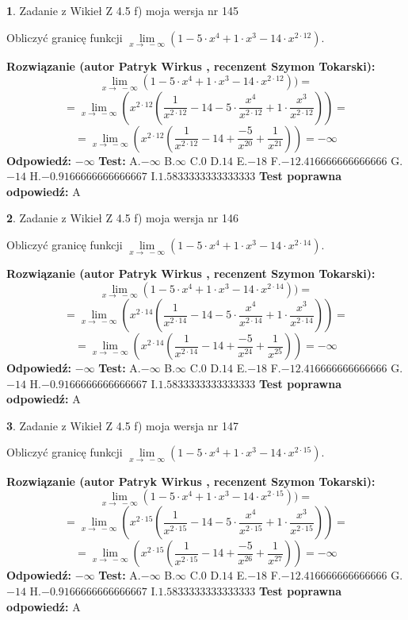 \documentclass[12pt, a4paper]{article}
\theoremstyle{definition} %
\newtheorem{zad}{}
\newcommand{\zadStart}[1]{\begin{zad}#1\newline}
\newcommand{\zadStop}{\end{zad}}
\newcommand{\rozwStart}[2]{\noindent \textbf{Rozwiązanie (autor #1 , recenzent #2): }\newline}
\newcommand{\rozwStop}{\newline}
\newcommand{\odpStart}{\noindent \textbf{Odpowiedź:}\newline}
\newcommand{\odpStop}{\newline}
\newcommand{\testStart}{\noindent \textbf{Test:}\newline}
\newcommand{\testStop}{\newline}
\newcommand{\kluczStart}{\noindent \textbf{Test poprawna odpowiedź:}\newline}
\newcommand{\kluczStop}{\newline}
\begin{document}
\zadStart{Zadanie z Wikieł Z 4.5 f) moja wersja nr 145}


Obliczyć granicę funkcji  $\lim\limits_{x\to\ -\infty}(1 - 5 \cdot x^{4}+1 \cdot x^{3}- 14 \cdot x^{2\cdot12})$.
\zadStop
\rozwStart{Patryk Wirkus}{Szymon Tokarski}
$$\lim\limits_{x\to\ -\infty}(1 - 5 \cdot x^{4}+1 \cdot x^{3}- 14 \cdot x^{2\cdot12}))=$$
$$=\lim\limits_{x\to\ -\infty}(x^{2\cdot12}(\frac{1}{x^{2\cdot12}}-14 -5 \cdot \frac{x^{4}}{x^{2\cdot12}}+1 \cdot \frac{x^{3}}{x^{2\cdot12}}))=$$
$$=\lim\limits_{x\to\ -\infty}(x^{2\cdot12}(\frac{1}{x^{2\cdot12}}-14 + \frac{-5}{x^{20}}+ \frac{1}{x^{21}}))=-\infty$$
\rozwStop
\odpStart
$-\infty$
\odpStop
\testStart
A.$-\infty$ B.$\infty$ C.$0$ D.$14$ E.$-18$
F.$-12.416666666666666$ G.$-14$
H.$-0.9166666666666667$
I.$1.5833333333333333$
\testStop
\kluczStart
A
\kluczStop



\zadStart{Zadanie z Wikieł Z 4.5 f) moja wersja nr 146}


Obliczyć granicę funkcji  $\lim\limits_{x\to\ -\infty}(1 - 5 \cdot x^{4}+1 \cdot x^{3}- 14 \cdot x^{2\cdot14})$.
\zadStop
\rozwStart{Patryk Wirkus}{Szymon Tokarski}
$$\lim\limits_{x\to\ -\infty}(1 - 5 \cdot x^{4}+1 \cdot x^{3}- 14 \cdot x^{2\cdot14}))=$$
$$=\lim\limits_{x\to\ -\infty}(x^{2\cdot14}(\frac{1}{x^{2\cdot14}}-14 -5 \cdot \frac{x^{4}}{x^{2\cdot14}}+1 \cdot \frac{x^{3}}{x^{2\cdot14}}))=$$
$$=\lim\limits_{x\to\ -\infty}(x^{2\cdot14}(\frac{1}{x^{2\cdot14}}-14 + \frac{-5}{x^{24}}+ \frac{1}{x^{25}}))=-\infty$$
\rozwStop
\odpStart
$-\infty$
\odpStop
\testStart
A.$-\infty$ B.$\infty$ C.$0$ D.$14$ E.$-18$
F.$-12.416666666666666$ G.$-14$
H.$-0.9166666666666667$
I.$1.5833333333333333$
\testStop
\kluczStart
A
\kluczStop



\zadStart{Zadanie z Wikieł Z 4.5 f) moja wersja nr 147}


Obliczyć granicę funkcji  $\lim\limits_{x\to\ -\infty}(1 - 5 \cdot x^{4}+1 \cdot x^{3}- 14 \cdot x^{2\cdot15})$.
\zadStop
\rozwStart{Patryk Wirkus}{Szymon Tokarski}
$$\lim\limits_{x\to\ -\infty}(1 - 5 \cdot x^{4}+1 \cdot x^{3}- 14 \cdot x^{2\cdot15}))=$$
$$=\lim\limits_{x\to\ -\infty}(x^{2\cdot15}(\frac{1}{x^{2\cdot15}}-14 -5 \cdot \frac{x^{4}}{x^{2\cdot15}}+1 \cdot \frac{x^{3}}{x^{2\cdot15}}))=$$
$$=\lim\limits_{x\to\ -\infty}(x^{2\cdot15}(\frac{1}{x^{2\cdot15}}-14 + \frac{-5}{x^{26}}+ \frac{1}{x^{27}}))=-\infty$$
\rozwStop
\odpStart
$-\infty$
\odpStop
\testStart
A.$-\infty$ B.$\infty$ C.$0$ D.$14$ E.$-18$
F.$-12.416666666666666$ G.$-14$
H.$-0.9166666666666667$
I.$1.5833333333333333$
\testStop
\kluczStart
A
\kluczStop
\end{document}
